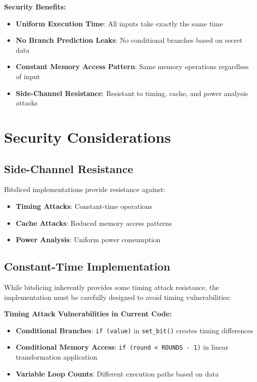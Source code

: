 \documentclass[12pt,a4paper]{article}
\begin{document}
\textbf{Security Benefits:}
\begin{itemize}
    \item \textbf{Uniform Execution Time}: All inputs take exactly the same time
    \item \textbf{No Branch Prediction Leaks}: No conditional branches based on secret data
    \item \textbf{Constant Memory Access Pattern}: Same memory operations regardless of input
    \item \textbf{Side-Channel Resistance}: Resistant to timing, cache, and power analysis attacks
\end{itemize}

\section{Security Considerations}

\subsection{Side-Channel Resistance}
Bitsliced implementations provide resistance against:
\begin{itemize}
    \item \textbf{Timing Attacks}: Constant-time operations
    \item \textbf{Cache Attacks}: Reduced memory access patterns
    \item \textbf{Power Analysis}: Uniform power consumption
\end{itemize}

\subsection{Constant-Time Implementation}
While bitslicing inherently provides some timing attack resistance, the implementation must be carefully designed to avoid timing vulnerabilities:

\textbf{Timing Attack Vulnerabilities in Current Code:}
\begin{itemize}
    \item \textbf{Conditional Branches}: \texttt{if (value)} in \texttt{set\_bit()} creates timing differences
    \item \textbf{Conditional Memory Access}: \texttt{if (round < ROUNDS - 1)} in linear transformation application
    \item \textbf{Variable Loop Counts}: Different execution paths based on data
\end{itemize}
\end{document}
